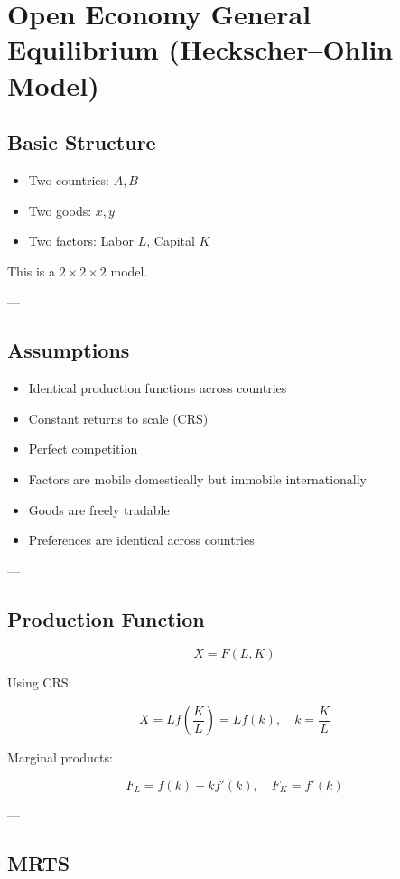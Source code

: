 \chapter{Open Economy General Equilibrium (Heckscher--Ohlin Model)}

\section{Basic Structure}

\begin{itemize}
    \item Two countries: $A, B$
    \item Two goods: $x, y$
    \item Two factors: Labor $L$, Capital $K$
\end{itemize}

This is a $2 \times 2 \times 2$ model.

---

\section{Assumptions}

\begin{itemize}
    \item Identical production functions across countries
    \item Constant returns to scale (CRS)
    \item Perfect competition
    \item Factors are mobile domestically but immobile internationally
    \item Goods are freely tradable
    \item Preferences are identical across countries
\end{itemize}

---

\section{Production Function}

\[
X = F(L,K)
\]

Using CRS:

\[
X = L f\left(\frac{K}{L}\right) = L f(k), \quad k = \frac{K}{L}
\]

Marginal products:

\[
F_L = f(k) - k f'(k), \quad F_K = f'(k)
\]

---

\section{MRTS}

